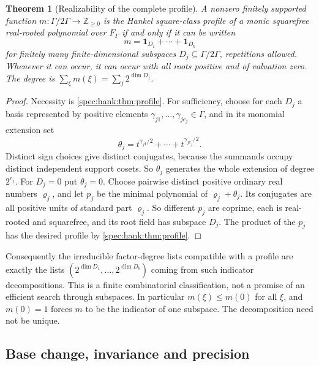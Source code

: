 \documentclass[11pt,a4paper]{article}
\numberwithin{equation}{section}
\newtheorem{theorem}{Theorem}[section]
\theoremstyle{definition}
\theoremstyle{remark}
\newcommand{\Z}{\mathbb Z}
\begin{document}
\begin{theorem}[Realizability of the complete profile]\label{spec:hank:thm:realizable}
A nonzero finitely supported function $m:\Gamma/2\Gamma\to\Z_{\ge0}$ is the
Hankel square-class profile of a monic squarefree real-rooted polynomial over
$F_\Gamma$ if and only if it can be written
\[
 m=\mathbf 1_{D_1}+\cdots+\mathbf 1_{D_b}
\]
for finitely many finite-dimensional subspaces $D_j\subseteq\Gamma/2\Gamma$,
repetitions allowed. Whenever it can occur, it can occur with \emph{all roots
positive and of valuation zero}. The degree is
$\sum_\xi m(\xi)=\sum_j2^{\dim D_j}$.
\end{theorem}
\begin{proof}
Necessity is \cref{spec:hank:thm:profile}. For sufficiency, choose for each
$D_j$ a basis represented by positive elements
$\gamma_{j1},\ldots,\gamma_{je_j}\in\Gamma$, and in its monomial extension set
\[
 \theta_j=t^{\gamma_{j1}/2}+\cdots+t^{\gamma_{je_j}/2}.
\]
Distinct sign choices give distinct conjugates, because the summands occupy
distinct independent support cosets. So $\theta_j$ generates the whole
extension of degree $2^{e_j}$. For $D_j=0$ put $\theta_j=0$. Choose pairwise
distinct positive ordinary real numbers $\varrho_j$, and let $p_j$ be the
minimal polynomial of $\varrho_j+\theta_j$. Its conjugates are all positive
units of standard part $\varrho_j$. So different $p_j$ are coprime, each is
real-rooted and squarefree, and its root field has subspace $D_j$. The product
of the $p_j$ has the desired profile by \cref{spec:hank:thm:profile}.
\end{proof}

Consequently the irreducible factor-degree lists compatible with a profile
are exactly the lists $(2^{\dim D_1},\ldots,2^{\dim D_b})$ coming from such
indicator decompositions. This is a finite combinatorial classification, not
a promise of an efficient search through subspaces. In particular
$m(\xi)\le m(0)$ for all $\xi$, and $m(0)=1$ forces $m$ to be the indicator of
one subspace. The decomposition need not be unique.

\subsection{Base change, invariance and precision}
\label{spec:hank:sub:functorial}
\end{document}
